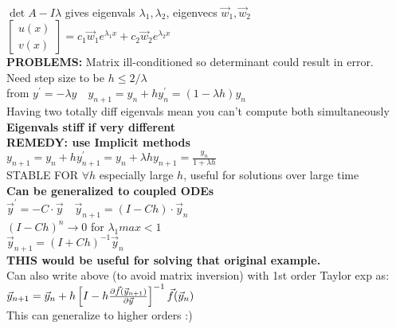 \documentclass[10pt]{article}
\begin{document}
{	\\$\det{A-I\lambda}$ gives eigenvals $\lambda_1, \lambda_2$, eigenvecs $\vec{w}_1, \vec{w}_2$
	\\$\begin{bmatrix}u(x)\\ v(x)\end{bmatrix} = c_1\vec{w}_1e^{\lambda_1x} + c_2\vec{w}_2e^{\lambda_2x}$
	\\\textbf{PROBLEMS:} Matrix ill-conditioned so determinant could result in error. 
	\\Need step size to be $h \leq 2/\lambda$
	\\from $y^\prime=-\lambda y \quad y_{n+1}=y_n+hy^\prime_n=(1-\lambda h)y_n$
	\\Having two totally diff eigenvals mean you can't compute both simultaneously
	\\\textbf{Eigenvals stiff if very different}
	\\\textbf{REMEDY: use Implicit methods}
	\\$y_{n+1}=y_n+hy_{n+1}^\prime=y_n+\lambda hy_{n+1}=\frac{y_n}{1+\lambda h}$
	\\STABLE FOR $\forall h$ especially large $h$, useful for solutions over large time
	\\\textbf{Can be generalized to coupled ODEs}
	\\$\vec{y}^\prime=-C\cdot\vec{y} \quad \vec{y}_{n+1}=(I -Ch)\cdot\vec{y}_n$
	\\$(I-Ch)^n\rightarrow 0$ for $\lambda_1{max} < 1$
	\\$\vec{y}_{n+1}=(I+Ch)^{-1}\vec{y}_n$
	\\\textbf{THIS would be useful for solving that original example.}
	\\Can also write above (to avoid matrix inversion) with 1st order Taylor exp as:
	\\$\vec{y}_{n+1}=\vec{y}_n+h\left[I-h\pdv{\vec{f}(\vec{y}_{n+1})}{\vec{y}}\right]^{-1}\vec{f}(\vec{y}_n)$
	\\This can generalize to higher orders :)
	
	
}
\newpage
\end{document}
